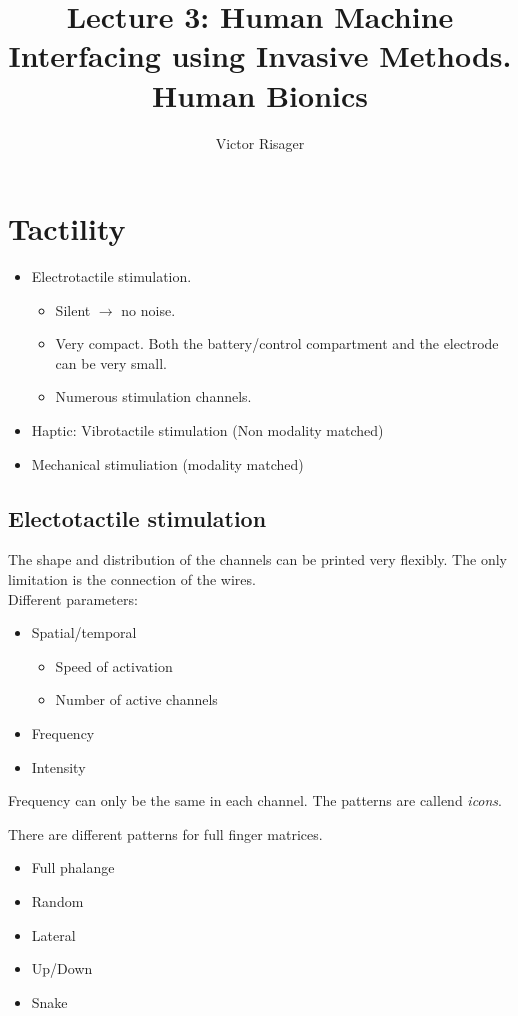 \documentclass[a4paper]{article}
\title{Lecture 3: Human Machine Interfacing using Invasive Methods.  \\
	\large Human Bionics}
\author{Victor Risager}
\begin{document}
\maketitle

\section{Tactility}

\begin{itemize}
	\item Electrotactile stimulation.
		\begin{itemize}
			\item Silent $ \rightarrow $ no noise.
			\item Very compact. Both the battery/control compartment and the electrode can be very small.
			\item Numerous stimulation channels.
		\end{itemize}
	\item Haptic: Vibrotactile stimulation (Non modality matched)
	\item Mechanical stimuliation (modality matched)
\end{itemize}

\subsection{Electotactile stimulation}
The shape and distribution of the channels can be printed very flexibly. The
only limitation is the connection of the wires.\\
Different parameters:
\begin{itemize}
	\item Spatial/temporal
		\begin{itemize}
			\item Speed of activation
			\item Number of active channels
		\end{itemize}
	\item Frequency
	\item Intensity
\end{itemize}

Frequency can only be the same in each channel. The patterns are callend \textit{icons}.  

There are different patterns for full finger matrices.
\begin{itemize}
	\item Full phalange
	\item Random
	\item Lateral
	\item Up/Down
	\item Snake
\end{itemize}
\end{document}
